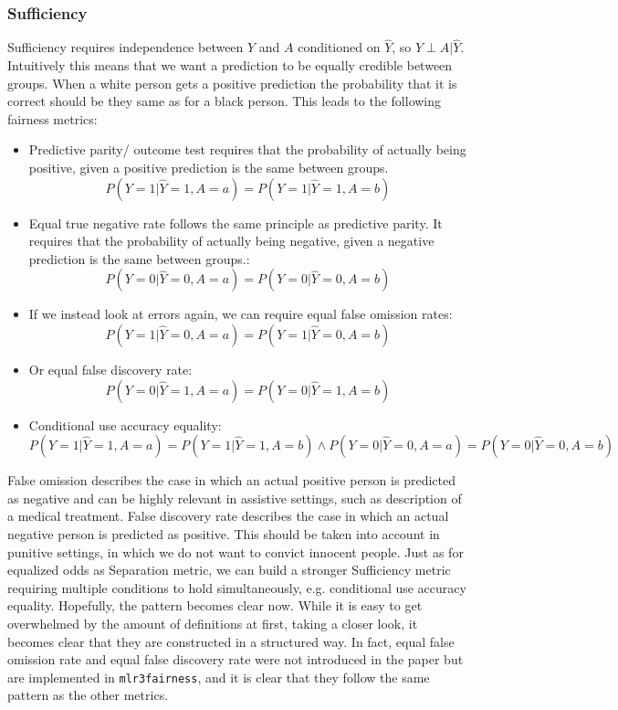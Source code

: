 \subsubsection*{Sufficiency}
Sufficiency requires independence between $Y$ and $A$ conditioned on $\hat{Y}$, so $Y \perp A | \hat{Y}$. Intuitively this means that we want a prediction to be equally credible between groups. When a white person gets a positive prediction the probability that it is correct should be they same as for a black person. This leads to the following fairness metrics:
\begin{itemize}
    \item Predictive parity/ outcome test requires that the probability of actually being positive, given a positive prediction is the same between groups. $$P(Y = 1 | \hat{Y} = 1, A = a) = P(Y = 1 | \hat{Y} = 1, A = b)$$
    \item Equal true negative rate follows the same principle as predictive parity. It requires that the probability of actually being negative, given a negative prediction is the same between groups.: $$P(Y = 0 | \hat{Y} = 0, A = a) = P(Y = 0 | \hat{Y} = 0, A = b)$$
    \item If we instead look at errors again, we can require equal false omission rates: $$P(Y = 1 | \hat{Y} = 0, A = a) = P(Y = 1 | \hat{Y} = 0, A = b)$$
    \item Or equal false discovery rate: $$P(Y = 0 | \hat{Y} = 1, A = a) = P(Y = 0 | \hat{Y} = 1, A = b)$$ 
    \item Conditional use accuracy equality: $$P(Y = 1 | \hat{Y} = 1, A = a) = P(Y = 1 | \hat{Y} = 1, A = b) \land P(Y = 0 | \hat{Y} = 0, A = a) = P(Y = 0 | \hat{Y} = 0, A = b)$$
\end{itemize}

False omission describes the case in which an actual positive person is predicted as negative and can be highly relevant in assistive settings, such as description of a medical treatment. False discovery rate describes the case in which an actual negative person is predicted as positive. This should be taken into account in punitive settings, in which we do not want to convict innocent people.
Just as for equalized odds as Separation metric, we can build a stronger Sufficiency metric requiring multiple conditions to hold simultaneously, e.g. conditional use accuracy equality.
Hopefully, the pattern becomes clear now. While it is easy to get overwhelmed by the amount of definitions at first, taking a closer look, it becomes clear that they are constructed in a structured way. In fact, equal false omission rate and equal false discovery rate were not introduced in the paper \cite{verma2018} but are implemented in \texttt{mlr3fairness}, and it is clear that they follow the same pattern as the other metrics.

